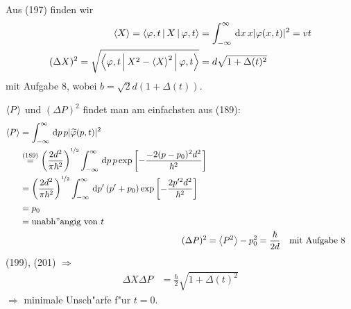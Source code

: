 \documentclass[a4paper]{scrartcl}
\begin{document}
{Aus (197) finden wir
\begin{align}
\Braket{ X} = \Braket{ \varphi, t | X | \varphi, t} & = \int_{-\infty}^\infty \, \mathrm{d} x \, x \vert \varphi(x,t) \vert^2 = vt \\
(\Delta X)^2 = \sqrt{ \Braket{ \varphi, t | X^2 - \Braket{X}^2 | \varphi, t}} & = d \sqrt{1 + \Delta(t)^2}
\end{align}
mit Aufgabe 8, wobei $b = \sqrt 2 d (1 + \Delta(t))$.

$\Braket P$ und $(\Delta P)^2$ findet man am einfachsten aus (189):
\begin{align}
\begin{split}
\Braket P & = \int_{-\infty}^\infty \, \mathrm{d} p \, p \vert \widetilde {\varphi}(p,t) \vert^2 \\
& \stackrel{(189)}=  \left( \frac{ 2d^2}{\pi \hbar^2} \right) ^{\nicefrac 1 2} \int_{-\infty}^\infty \, \mathrm{d} p \, p \exp \left[ - \frac{ - 2(p - p_0)^2 d^2}{\hbar^2} \right] \\
& = \left( \frac{ 2d^2}{\pi \hbar^2} \right) ^{\nicefrac 1 2} \int_{-\infty}^\infty \, \mathrm{d} p' \, ( p' + p_0 ) \exp \left[ - \frac{ 2 p'^2 d^2}{\hbar^2} \right] \\
& = p_0 \\
& = \mathrm{unabh"angig \ von \ } t
\end{split} \\
(\Delta P)^2 & = \Braket{ P^2} - p_0^2 = \frac \hbar {2d} \quad \mathrm{mit \ Aufgabe \ 8}
\end{align}
(199), (201) $\Longrightarrow$
\begin{align}
\Delta X \Delta P & = \frac \hbar 2 \sqrt{ 1 + \Delta(t)^2}
\end{align}
$\Longrightarrow$ minimale Unsch"arfe f"ur $t=0$.

}
\end{document}
